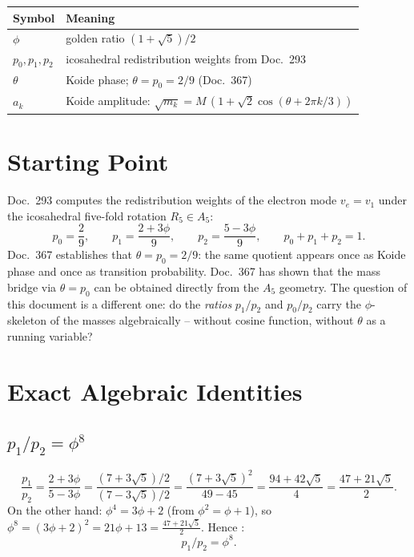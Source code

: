 \medskip
\begin{tabular}{@{}lp{11cm}@{}}
\toprule
\textbf{Symbol} & \textbf{Meaning} \\
\midrule
$\phi$ & golden ratio $(1+\sqrt5)/2$ \\
$p_0,p_1,p_2$ & icosahedral redistribution weights from Doc.~293 \\
$\theta$ & Koide phase; $\theta=p_0=2/9$ (Doc.~367) \\
$a_k$ & Koide amplitude: $\sqrt{m_k}=M\,(1+\sqrt2\cos(\theta+2\pi k/3))$ \\
\bottomrule
\end{tabular}

\section{Starting Point}

Doc.~293 computes the redistribution weights of the electron mode $v_e=v_1$
under the icosahedral five-fold rotation $R_5\in A_5$:
\[
  p_0 = \frac{2}{9}, \qquad
  p_1 = \frac{2+3\phi}{9}, \qquad
  p_2 = \frac{5-3\phi}{9}, \qquad
  p_0+p_1+p_2=1.
\]
Doc.~367 establishes that $\theta=p_0=2/9$: the same quotient appears once
as Koide phase and once as transition probability. Doc.~367 has shown that the mass bridge via $\theta = p_0$ can be obtained
directly from the $A_5$ geometry. The question of this document is a different
one: do the \emph{ratios} $p_1/p_2$ and $p_0/p_2$ carry the $\phi$-skeleton
of the masses algebraically -- without cosine function, without $\theta$ as a
running variable?

\section{Exact Algebraic Identities}

\subsection{$p_1/p_2 = \phi^8$}

\begin{equation}\label{eq:p1p2}
  \frac{p_1}{p_2} = \frac{2+3\phi}{5-3\phi} = \frac{(7+3\sqrt5)/2}{(7-3\sqrt5)/2}
  = \frac{(7+3\sqrt5)^2}{49-45} = \frac{94+42\sqrt5}{4} = \frac{47+21\sqrt5}{2}.
\end{equation}
On the other hand: $\phi^4 = 3\phi+2$ (from $\phi^2=\phi+1$), so
$\phi^8 = (3\phi+2)^2 = 21\phi+13 = \tfrac{47+21\sqrt5}{2}$. Hence \BM:
\[
  \boxed{p_1/p_2 = \phi^8.}
\]

